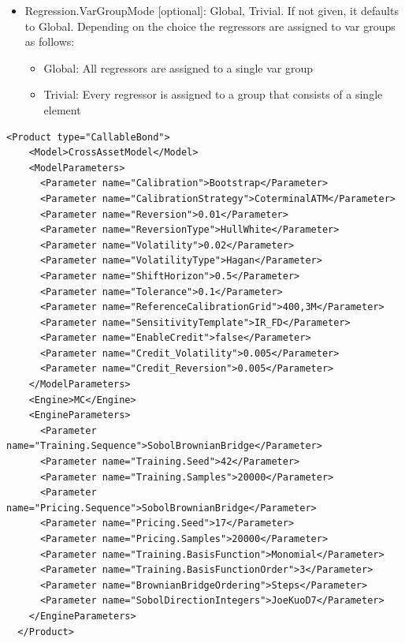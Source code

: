 \begin{itemize}
  If not given, it defaults to 0. If set to 0, there is no limit to number of regressors per model. This setting is only
  relevant when RegressorModel is Lagged or LaggedEQ
\item Regression.VarGroupMode [optional]: Global, Trivial. If not given, it defaults to Global.
  Depending on the choice the regressors are assigned to var groups as follows:
    \begin{itemize}
    \item Global: All regressors are assigned to a single var group
    \item Trivial: Every regressor is assigned to a group that consists of a single element
  \end{itemize}
\end{itemize}

\begin{longlisting}
\begin{verbatim}
<Product type="CallableBond">
    <Model>CrossAssetModel</Model>
    <ModelParameters>
      <Parameter name="Calibration">Bootstrap</Parameter>
      <Parameter name="CalibrationStrategy">CoterminalATM</Parameter>
      <Parameter name="Reversion">0.01</Parameter>
      <Parameter name="ReversionType">HullWhite</Parameter>
      <Parameter name="Volatility">0.02</Parameter>
      <Parameter name="VolatilityType">Hagan</Parameter>
      <Parameter name="ShiftHorizon">0.5</Parameter>
      <Parameter name="Tolerance">0.1</Parameter>
      <Parameter name="ReferenceCalibrationGrid">400,3M</Parameter>
      <Parameter name="SensitivityTemplate">IR_FD</Parameter>
      <Parameter name="EnableCredit">false</Parameter>
      <Parameter name="Credit_Volatility">0.005</Parameter>
      <Parameter name="Credit_Reversion">0.005</Parameter>
    </ModelParameters>
    <Engine>MC</Engine>
    <EngineParameters>
      <Parameter name="Training.Sequence">SobolBrownianBridge</Parameter>
	  <Parameter name="Training.Seed">42</Parameter>
	  <Parameter name="Training.Samples">20000</Parameter>
	  <Parameter name="Pricing.Sequence">SobolBrownianBridge</Parameter>
	  <Parameter name="Pricing.Seed">17</Parameter>
	  <Parameter name="Pricing.Samples">20000</Parameter>
	  <Parameter name="Training.BasisFunction">Monomial</Parameter>
	  <Parameter name="Training.BasisFunctionOrder">3</Parameter>
	  <Parameter name="BrownianBridgeOrdering">Steps</Parameter>
	  <Parameter name="SobolDirectionIntegers">JoeKuoD7</Parameter>
    </EngineParameters>
  </Product>
\end{verbatim}
\caption{Configuration for Product CallableBond, Model CrossAssetModel, Engine MC}
\label{lst:peconfig_CallableBond_CAM_MC}
\end{longlisting}

